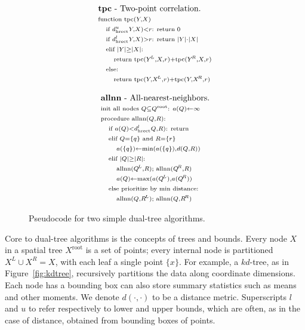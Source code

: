 \documentclass[times, leqno,twocolumn]{article}
\newcommand{\union}{\cup}
\newcommand{\fig}[1]{Figure~\ref{fig:#1}}
\newcommand{\X}{\\ \scriptstyle}
\newcommand{\x}{\\ \hspace{0.13in} \scriptstyle}
\newcommand{\xx}{\\ \hspace{0.26in} \scriptstyle}
\newcommand{\kdroot}[1]{#1^{\text{root}}}
\newcommand{\kdleft}[1]{#1^{\!L}}
\newcommand{\kdright}[1]{#1^{\!R}}
\newcommand{\lo}[1]{#1^{l}}
\newcommand{\up}[1]{#1^{u}}
\newcommand{\distlo}[1]{\lo{d_{\text{hrect}}}}
\newcommand{\distup}[1]{\up{d_{\text{hrect}}}}
\newcommand{\dist}[2]{d(#1,#2)}
\begin{document}
\begin{figure*}
  \begin{minipage}{3.88in}
    \begin{minipage}{1.8in}
      \begin{displaymath}
        \begin{array}{l}
          \text{{\bf tpc} - Two-point correlation.}
          \X \text{function tpc}(Y, X)
          \x \text{if }\distup(Y, X) < r\text{: return }0
          \x \text{if }\distlo(Y, X) > r\text{: return } |Y| \cdot |X|
          \x \text{elif }|Y| \geq |X|\text{:}
          \xx \text{return tpc}(\kdleft{Y}, X, r) + \text{tpc}(\kdright{Y}, X, r)
          \x \text{else:}
          \xx \text{return tpc}(Y, \kdleft{X}, r) + \text{tpc}(Y, \kdright{X}, r)
        \end{array}
       \end{displaymath}
       \caption{\footnotesize \label{fig:allnntpc} Pseudocode for two simple dual-tree algorithms.}
      \end{minipage}
      \begin{minipage}{2.0in}
       \begin{displaymath}
        \begin{array}{l}
          \text{{\bf allnn} - All-nearest-neighbors.}
          \X \text{init all nodes }Q \subseteq \kdroot{Q}\text{: }a(Q) \gets \infty
          \X \text{procedure allnn}(Q,R)\text{:}
          \x \text{if }a(Q) < \distlo(Q, R)\text{: return}
          \x \text{elif }Q = \{q\} \text{ and } R = \{r\}
          \xx a(\{q\}) \gets \min(a(\{q\}), \dist{Q}{R})
          \x \text{elif }|Q| \geq |R|\text{:}
          \xx \text{allnn}(\kdleft{Q}, R); \text{ allnn}(\kdright{Q}, R)
          \xx a(Q) \gets \max(a(\kdleft{Q}), a(\kdright{Q}))
          \x \text{else prioritize by min distance:}
          \xx \text{allnn}(Q, \kdleft{R}); \text{ allnn}(Q, \kdright{R})
          \\
        \end{array}
       \end{displaymath}
      \end{minipage}
  \end{minipage}
  \vspace{-.2in}
\end{figure*}

Core to dual-tree algorithms is the concepts of trees and bounds.
Every node $X$ in a spatial tree $\kdroot{X}$ is a set of points; every internal node is partitioned $\kdleft{X} \union \kdright{X} = X$, with each leaf a single point $\{x\}$.
For example, a $kd$-tree\cite{kdtree}, as in \fig{kdtree}, recursively partitions the data along coordinate dimensions.
Each node has a bounding box can also store summary statistics such as means and other moments.
We denote $\dist{\cdot}{\cdot}$ to be a distance metric.
Superscripts $l$ and $u$ to refer respectively to lower and upper bounds, which are often, as in the case of distance, obtained from bounding boxes of points.
\end{document}
